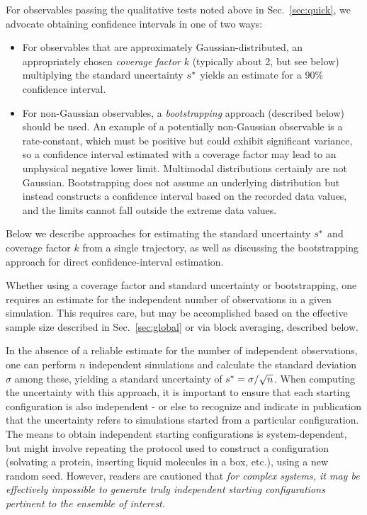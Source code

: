 For observables passing the qualitative tests noted above in Sec.\ \ref{sec:quick}, we advocate obtaining confidence intervals in one of two ways:
\begin{itemize}
\item For observables that are approximately Gaussian-distributed, an appropriately chosen \emph{coverage factor} $k$ (typically about 2, but see below) multiplying the standard uncertainty $s^*$ yields an estimate for a 90\% confidence interval.  
\item For non-Gaussian observables, a \emph{bootstrapping} approach (described below) should be used.  An example of a potentially non-Gaussian observable is a rate-constant, which must be positive but could exhibit significant variance, so a confidence interval estimated with a coverage factor may lead to an unphysical negative lower limit.  Multimodal distributions certainly are not Gaussian.  Bootstrapping does not assume an underlying distribution but instead constructs a confidence interval based on the recorded data values, and the limits cannot fall outside the extreme data values.
\end{itemize}


Below we describe approaches for estimating the standard uncertainty $s^*$ and coverage factor $k$ from a single trajectory, as well as discussing the bootstrapping approach for direct confidence-interval estimation.

Whether using a coverage factor and standard uncertainty or bootstrapping, one requires an estimate for the independent number of observations in a given simulation.  This requires care, but may be accomplished based on the effective sample size described in Sec.\ \ref{sec:global} or via block averaging, described below.

In the absence of a reliable estimate for the number of independent observations, one can perform $n$ independent simulations and calculate the standard deviation $\sigma$ among these, yielding a standard uncertainty of $s^* = \sigma / \sqrt{n}$.  When computing the uncertainty with this approach, it is important to ensure that each starting configuration is also independent - or else to recognize and indicate in publication that the uncertainty refers to simulations started from a particular configuration.  The means to obtain independent starting configurations is system-dependent, but might involve repeating the protocol used to construct a configuration (solvating a protein, inserting liquid molecules in a box, etc.), using a new random seed.  However, readers are cautioned that \emph{for complex systems, it may be effectively impossible to generate truly independent starting configurations pertinent to the ensemble of interest.}

